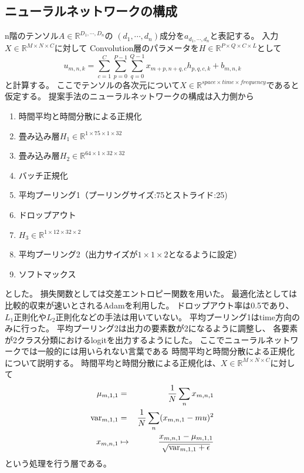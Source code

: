 \subsection{\mc ニューラルネットワークの構成}
n階のテンソル\(A\in \mathbb R^{D_1,\cdots ,D_n}\)の
\((d_1,\cdots,d_n)\)成分を\(a_{d_1,\cdots,d_n}\)と表記する。
入力\(X \in \mathbb R^{M\times N\times C}\)に対して
Convolution層のパラメータを\(H \in \mathbb R^{P\times Q \times C \times L}\)として
\begin{equation}
    u_{m,n,k} = \sum_{c=1}^C\sum_{p=0}^{P-1}\sum_{q=0}^{Q-1} x_{m+p,n+q,c} h_{p,q,c,k} + b_{m,n,k}
\end{equation} 
と計算する。
ここでテンソルの各次元について\(X \in \mathbb R^{space\times time\times frequency}\)であると仮定する。
提案手法のニューラルネットワークの構成は入力側から
\begin{enumerate}
    \item 時間平均と時間分散による正規化
    \item 畳み込み層\(H_1 \in \mathbb R^{1\times 75 \times 1 \times 32}\)
    \item 畳み込み層\(H_2 \in \mathbb R^{64\times 1 \times 32 \times 32}\)
    \item バッチ正規化
    \item 平均プーリング1（プーリングサイズ:75とストライド:25)
    \item ドロップアウト
    \item \(H_3 \in \mathbb R^{1\times 12 \times 32 \times 2}\)
    \item 平均プーリング2（出力サイズが\(1\times 1\times 2\)となるように設定）
    \item ソフトマックス
\end{enumerate}
とした。
損失関数としては交差エントロピー関数を用いた。
最適化法としては比較的収束が速いとされるAdamを利用した。
ドロップアウト率は0.5であり、\(L_1\)正則化や\(L_2\)正則化などの手法は用いていない。
平均プーリング1はtime方向のみに行った。
平均プーリング2は出力の要素数が\(2\)になるように調整し、
各要素が2クラス分類におけるlogitを出力するようにした。
ここでニューラルネットワークでは一般的には用いられない言葉である
時間平均と時間分散による正規化について説明する。
時間平均と時間分散による正規化は、\(X \in \mathbb R^{M\times N\times C}\)に対して
\begin{eqnarray}
    \mu_{m,1,1} & = & \frac{1}{N}\sum_n x_{m,n,1} \\
    {\rm var}_{m,1,1} & = & \frac{1}{N}\sum_n (x_{m,n,1} - mu)^2 \\
    x_{m,n,1} & \mapsto & \frac{x_{m,n,1} - \mu_{m,1,1}}{\sqrt{{\rm var}_{m,1,1}+\epsilon}}
\end{eqnarray}
という処理を行う層である。

